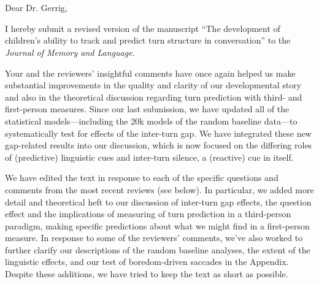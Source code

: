 \documentclass[11pt,a4paper]{letter} %
\def\opening#1{\thispagestyle{empty}
{\centering\fromaddress \vspace{0.6in} \\ %
\hspace*{\longindentation}\hspace*{\fill}\par} %
{\raggedright \toname \\ \toaddress \par} %
\vspace{0.4in} %
\noindent #1 %
}
\begin{document}

\begin{letter}{}


\opening{Dear Dr. Gerrig,}

\smallskip

\noindent I hereby submit a revised version of the manuscript ``The development of children's ability to track and predict turn structure in conversation'' to the \textit{Journal of Memory and Language}.

\noindent Your and the reviewers' insightful comments have once again helped us make substantial improvements in the quality and clarity of our developmental story and also in the theoretical discussion regarding turn prediction with third- and first-person measures. Since our last submission, we have updated all of the statistical models---including the 20k models of the random baseline data---to systematically test for effects of the inter-turn gap. We have integrated these new gap-related results into our discussion, which is now focused on the differing roles of (predictive) linguistic cues and inter-turn silence, a (reactive) cue in itself.

\noindent We have edited the text in response to each of the specific questions and comments from the most recent reviews (see below). In particular, we added more detail and theoretical heft to our discussion of inter-turn gap effects, the question effect and the implications of measuring of turn prediction in a third-person paradigm, making specific predictions about what we might find in a first-person measure. In response to some of the reviewers' comments, we've also worked to further clarify our descriptions of the random baseline analyses, the extent of the linguistic effects, and our test of boredom-driven saccades in the Appendix. Despite these additions, we have tried to keep the text as short as possible.


\end{letter}
\end{document}
